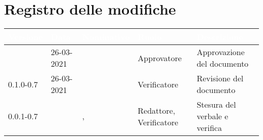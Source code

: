\section*{Registro delle modifiche}
{
\setcounter{table}{-1}
{
\renewcommand{\arraystretch}{1.5}
\centering
\begin{longtable}{C{2cm} | C{2.5cm} | C{3.5cm} | C{2.7cm} | C{4.2cm}}
\textcolor{white}{\textbf{Versione}}&
\textcolor{white}{\textbf{Data}}&
\textcolor{white}{\textbf{Nominativo}}&
\textcolor{white}{\textbf{Ruolo}}&
\textcolor{white}{\textbf{Descrizione}}\\	
\endhead
		
\Versionedoc{} & 26-03-2021 & \Approvatore{} & Approvatore & Approvazione del documento\\

0.1.0-0.7 & 26-03-2021 & \PA{} & Verificatore & Revisione del documento\\

0.0.1-0.7 & \Data{} & \Redattori{}, \SH{} & Redattore, Verificatore & Stesura del verbale e verifica\\
		
\end{longtable}
}
}
